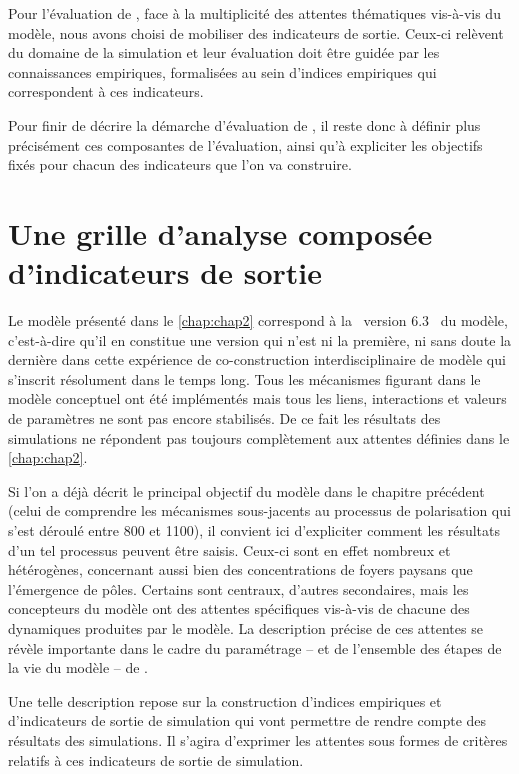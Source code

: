Pour l'évaluation de \simfeodal{}, face à la multiplicité des attentes thématiques vis-à-vis du modèle, nous avons choisi de mobiliser des \og indicateurs de sortie\fg{}.
Ceux-ci relèvent du domaine de la simulation et leur évaluation doit être guidée par les connaissances empiriques, formalisées au sein d'\og indices empiriques\fg{} qui correspondent à ces indicateurs.

Pour finir de décrire la démarche d'évaluation de \simfeodal{}, il reste donc à définir plus précisément ces composantes de l'évaluation, ainsi qu'à expliciter les objectifs fixés pour chacun des indicateurs que l'on va construire.

\let\orisectionmark\sectionmark
\renewcommand\sectionmark[1]{}%
\section{Une grille d'analyse composée d'indicateurs de sortie \label{sec:indicateurs-sortie}}
\orisectionmark{Les indicateurs de sortie}
\let\sectionmark\orisectionmark

Le modèle \simfeodal{} présenté dans le \cref{chap:chap2} correspond à la \og version 6.3 \fg{} du modèle, c'est-à-dire qu'il en constitue une version qui n'est ni la première, ni sans doute la dernière dans cette expérience de co-construction interdisciplinaire de modèle qui s'inscrit résolument dans le temps long.
Tous les mécanismes figurant dans le modèle conceptuel ont été implémentés mais tous les liens, interactions et valeurs de paramètres ne sont pas encore stabilisés.
De ce fait les résultats des simulations ne répondent pas toujours complètement aux attentes définies dans le \cref{chap:chap2}.

Si l'on a déjà décrit le principal objectif du modèle dans le chapitre précédent (celui de comprendre les mécanismes sous-jacents au processus de polarisation qui s'est déroulé entre 800 et 1100), il convient ici d'expliciter comment les résultats d'un tel processus peuvent être saisis.
Ceux-ci sont en effet nombreux et hétérogènes, concernant aussi bien des concentrations de foyers paysans que l'émergence de pôles.
Certains sont centraux, d'autres secondaires, mais les concepteurs du modèle ont des attentes spécifiques vis-à-vis de chacune des dynamiques produites par le modèle.
La description précise de ces attentes se révèle importante dans le cadre du paramétrage -- et de l'ensemble des étapes de la vie du modèle -- de \simfeodal{}.

Une telle description repose sur la construction d'\og{}indices empiriques\fg{} et d'\og{}indicateurs de sortie de simulation\fg{} qui vont permettre de rendre compte des résultats des simulations.
Il s'agira d'exprimer les attentes sous formes de critères relatifs à ces indicateurs de sortie de simulation.

